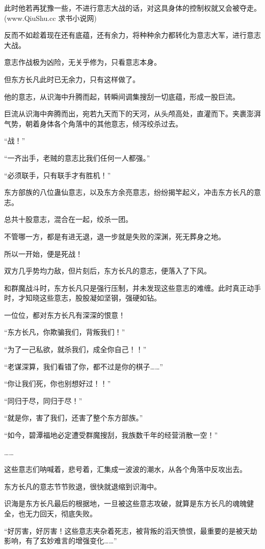 \begin{this_body}
此时他若再犹豫一些，不进行意志大战的话，对这具身体的控制权就又会被夺走。(www.QiuShu.cc 求书小说网)

反而不如趁着现在还有底蕴，还有余力，将种种余力都转化为意志大军，进行意志大战。

意志作战极为凶险，无关乎修为，只看意志本身。

但东方长凡此时已无余力，只有这样做了。

他的意志，从识海中升腾而起，转瞬间调集搜刮一切底蕴，形成一股巨流。

巨流从识海中奔腾而出，宛若九天而下的天河，从头颅高处，直灌而下。夹裹澎湃气势，朝着身体各个角落中的其他意志，倾泻绞杀过去。

“战！”

“一齐出手，老贼的意志比我们任何一人都强。”

“必须联手，只有联手才有胜机！”

东方部族的八位蛊仙意志，以及东方余亮意志，纷纷揭竿起义，冲击东方长凡的意志。

总共十股意志，混合在一起，绞杀一团。

不管哪一方，都是有进无退，退一步就是失败的深渊，死无葬身之地。

所以一开始，便是死战！

双方几乎势均力敌，但片刻后，东方长凡的意志，便落入了下风。

和群魔战斗时，东方长凡只是强行压制，并未发现这些意志的难缠。此时真正动手时，才知晓这些意志，股股凝如坚钢，强硬如钻。

一位位，都对东方长凡有深深的恨意！

“东方长凡，你欺骗我们，背叛我们！”

“为了一己私欲，就杀我们，成全你自己！！”

“老谋深算，我们看错了你，都不过是你的棋子……”

“你让我们死，你也别想好过！！”

“同归于尽，同归于尽！”

“就是你，害了我们，还害了整个东方部族。”

“如今，碧潭福地必定遭受群魔搜刮，我族数千年的经营消散一空！”

……

这些意志们呐喊着，悲号着，汇集成一波波的潮水，从各个角落中反攻出去。

东方长凡的意志节节败退，很快就退缩到识海中。

识海是东方长凡最后的根据地，一旦被这些意志攻破，就算是东方长凡的魂魄健全，也无力回天，彻底失败。

“好厉害，好厉害！这些意志夹杂着死志，被背叛的滔天愤恨，最重要的是被天劫影响，有了玄妙难言的增强变化……”


\end{this_body}
